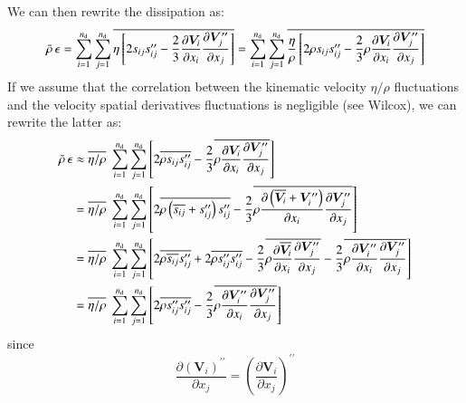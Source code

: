 \documentclass{warpdoc}
\newcommand{\alb}{\vspace{0.2cm}\\} %
\newcommand{\nd}{{{n}_{\rm d}}}
\begin{document}
%
We can then rewrite the dissipation as:
%
\begin{equation}
  \wbar{\rho}\, \epsilon
    =\sum_{i=1}^{\nd} \sum_{j=1}^{\nd} \overline{ \eta  \left[ 2 s_{ij} s_{ij}^{\prime\prime}
        -\frac{2}{3} \frac{\partial \bm{V}_i}{\partial x_i}  \frac{\partial \bm{V}_j^{\prime\prime}}{\partial x_j}\right]  }
    =\sum_{i=1}^{\nd} \sum_{j=1}^{\nd} \overline{ \frac{\eta}{\rho} \left[ 2 \rho s_{ij} s_{ij}^{\prime\prime}
        -\frac{2}{3} \rho  \frac{\partial \bm{V}_i}{\partial x_i}  \frac{\partial \bm{V}_j^{\prime\prime}}{\partial x_j}\right]  }
\end{equation}
%
If we assume that the correlation between the
kinematic velocity $\eta/\rho$ fluctuations and the velocity spatial
derivatives fluctuations is negligible (see Wilcox\cite{turb:wilcoxbook}),
we can rewrite the latter as:
%
\begin{align*}
  \wbar{\rho}\, \epsilon
  &\approx \overline{\eta/\rho}~ 
      \sum_{i=1}^{\nd} \sum_{j=1}^{\nd}
      \left[
         2 \overline{ \rho s_{ij} s_{ij}^{\prime\prime}}
        -\frac{2}{3}  \overline{ \rho  \frac{\partial \bm{V}_i}{\partial x_i}  \frac{\partial \bm{V}_j^{\prime\prime}}{\partial x_j}}
      \right]\alb
    &=\overline{\eta/\rho}~ 
      \sum_{i=1}^{\nd} \sum_{j=1}^{\nd}
      \left[
         2 \overline{ \rho  \left(\overline{s_{ij}}+s_{ij}^{\prime\prime}\right) s_{ij}^{\prime\prime}}
        -\frac{2}{3}  \overline{ \rho  \frac{\partial \left(\overline{\bm{V}_i}+\bm{V}_i^{\prime\prime}\right)}{\partial x_i}  \frac{\partial \bm{V}_j^{\prime\prime}}{\partial x_j}}
      \right]\alb
    &=\overline{\eta/\rho}~ 
      \sum_{i=1}^{\nd} \sum_{j=1}^{\nd}
      \left[
         2 \overline{ \rho  \overline{s_{ij}}  s_{ij}^{\prime\prime}}
        +2 \overline{ \rho  s_{ij}^{\prime\prime}  s_{ij}^{\prime\prime}}
        -\frac{2}{3}  \overline{ \rho  \frac{\partial \overline{\bm{V}_i}}{\partial x_i}  \frac{\partial \bm{V}_j^{\prime\prime}}{\partial x_j}}
        -\frac{2}{3}  \overline{ \rho  \frac{\partial \bm{V}_i^{\prime\prime}}{\partial x_i}  \frac{\partial \bm{V}_j^{\prime\prime}}{\partial x_j}}
      \right]\alb
    &=\overline{\eta/\rho}~ 
      \sum_{i=1}^{\nd} \sum_{j=1}^{\nd}
      \left[
        2 \overline{ \rho  s_{ij}^{\prime\prime}  s_{ij}^{\prime\prime}}
        -\frac{2}{3}  \overline{ \rho  \frac{\partial \bm{V}_i^{\prime\prime}}{\partial x_i}  \frac{\partial \bm{V}_j^{\prime\prime}}{\partial x_j}}
      \right]
\end{align*}
%
since
%
\begin{equation}
      \frac{\partial \left(\bm{V}_i\right)^{\prime\prime}}{\partial x_j}
   =  \left( \frac{\partial \bm{V}_i}{\partial x_j} \right)^{\prime\prime}
\end{equation}
\end{document}
